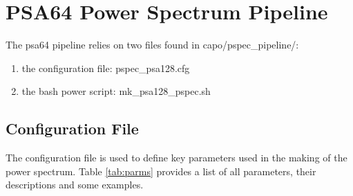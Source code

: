 \documentclass[onecolumn]{emulateapj}
\begin{document}
\section{PSA64 Power Spectrum Pipeline}{
The psa64 pipeline relies on two files found in capo/pspec\_pipeline/:


\begin{enumerate}
\item the configuration file: pspec\_psa128.cfg
\item the bash power script: mk\_psa128\_pspec.sh
\end{enumerate}
\subsection{Configuration File} 
{
The configuration file is used to define key parameters used in the making of the power spectrum. Table \ref{tab:parms} provides a list of all parameters, their descriptions and some examples.


}}
\end{document}
